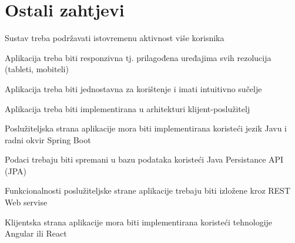 				\eject				

			
				
	
		\section{Ostali zahtjevi}
			\begin{packed_item}
				\item Sustav treba podržavati istovremenu aktivnost više korisnika
				\item Aplikacija treba biti responzivna tj. prilagođena uređajima svih rezolucija (tableti, mobiteli) 
				\item Aplikacija treba biti jednostavna za korištenje i imati intuitivno sučelje
				\item Aplikacija treba biti implementirana u arhitekturi klijent-poslužitelj
				\item Poslužiteljska strana aplikacije mora biti implementirana koristeći jezik Javu i radni okvir Spring Boot
				\item Podaci trebaju biti spremani u bazu podataka koristeći Java Persistance API (JPA)
				\item Funkcionalnosti poslužiteljske strane aplikacije trebaju biti izložene kroz REST Web servise
				\item Klijentska strana aplikacije mora biti implementirana koristeći tehnologije Angular ili React
			\end{packed_item}
		 
